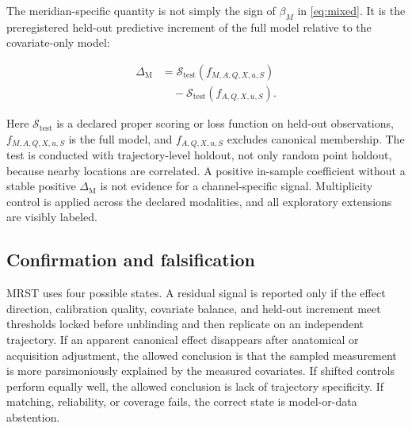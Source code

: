 \documentclass[conference]{IEEEtran}
\begin{document}
The meridian-specific quantity is not simply the sign of \(\beta_M\) in \eqref{eq:mixed}. It is the preregistered held-out predictive increment of the full model relative to the covariate-only model:

\begin{align}
\Delta_{\mathrm{M}} &=
\mathcal{S}_{\mathrm{test}}\left(f_{M,A,Q,X,u,S}\right) \nonumber\\
&\quad - \mathcal{S}_{\mathrm{test}}\left(f_{A,Q,X,u,S}\right).
\label{eq:increment}
\end{align}

Here \(\mathcal{S}_{\mathrm{test}}\) is a declared proper scoring or loss function on held-out observations, \(f_{M,A,Q,X,u,S}\) is the full model, and \(f_{A,Q,X,u,S}\) excludes canonical membership. The test is conducted with trajectory-level holdout, not only random point holdout, because nearby locations are correlated. A positive in-sample coefficient without a stable positive \(\Delta_{\mathrm{M}}\) is not evidence for a channel-specific signal. Multiplicity control is applied across the declared modalities, and all exploratory extensions are visibly labeled.

\subsection{Confirmation and falsification}

MRST uses four possible states. A residual signal is reported only if the effect direction, calibration quality, covariate balance, and held-out increment meet thresholds locked before unblinding and then replicate on an independent trajectory. If an apparent canonical effect disappears after anatomical or acquisition adjustment, the allowed conclusion is that the sampled measurement is more parsimoniously explained by the measured covariates. If shifted controls perform equally well, the allowed conclusion is lack of trajectory specificity. If matching, reliability, or coverage fails, the correct state is model-or-data abstention.
\end{document}

